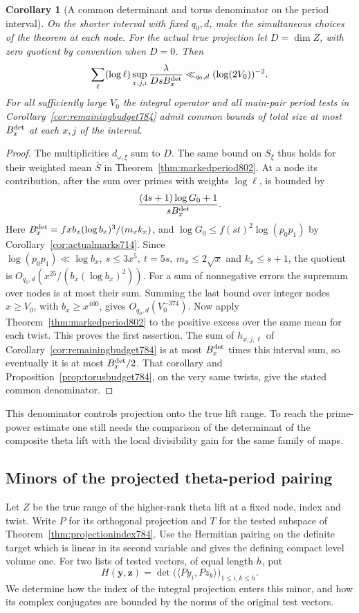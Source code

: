 \documentclass[a4paper,11pt]{article}
\newtheorem{corollary}[proposition]{Corollary}
\theoremstyle{definition}
\theoremstyle{remark}
\numberwithin{equation}{section}
\begin{document}
\begin{corollary}[A common determinant and torus denominator on the period interval]
\leavevmode\label{cor:actualdenom803}
On the shorter interval with fixed \(q_0,d\), make the
simultaneous choices of the theorem at each node. For the
actual true projection let \(D=\dim Z\), with zero quotient
by convention when \(D=0\). Then
\[
    \sum_\ell(\log\ell)
       \sup_{x,j,\iota}
          \frac{\lambda}{Ds B_x^{\rm det}}
           \ll_{q_0,d}(\log(2V_0))^{-2}.
\]
For all sufficiently large \(V_0\) the integral operator and
all main-pair period tests in Corollary~\ref{cor:remainingbudget784}
admit common bounds of total size at most \(B_x^{\rm det}\)
at each \(x,j\) of the interval.
\end{corollary}
\begin{proof}
The multiplicities \(d_{\omega,\xi}\) sum to \(D\).
The same bound on \(S_\xi\) thus holds for their weighted mean
\(\overline S\) in Theorem~\ref{thm:markedperiod802}.
At a node its contribution, after the sum over primes with
weights \(\log\ell\), is bounded by
\[
         \frac{(4s+1)\log G_0+1}{sB_x^{\rm det}} .
\]
Here \(B_x^{\rm det}=fxb_x(\log b_x)^3/(m_x k_x)\), and
\(\log G_0\le f(st)^2\log(p_0p_1)\) by
Corollary~\ref{cor:actualmarks714}. Since \(\log(p_0p_1)
\ll\log b_x,\ s\le3x^5,\ t=5s,\ m_x\le2\sqrt{x}\) and
\(k_x\le s+1\), the quotient is
\(O_{q_0,d}(x^{25}/(b_x(\log b_x)^2))\).
For a sum of nonnegative errors the supremum over nodes is at
most their sum. Summing the last bound over integer nodes
\(x\ge V_0\), with \(b_x\ge x^{400}\), gives
\(O_{q_0,d}(V_0^{-374})\). Now apply
Theorem~\ref{thm:markedperiod802} to the positive excess over
the same mean for each twist. This proves the first assertion.
The sum of \(h_{x,j,\ell}\) of
Corollary~\ref{cor:remainingbudget784} is at most \(B_x^{\rm det}\)
times this interval sum, so eventually it is at most
\(B_x^{\rm det}/2\). That corollary and
Proposition~\ref{prop:torusbudget784}, on the very same twists,
give the stated common denominator.
\end{proof}
This denominator controls projection onto the true lift range.
To reach the prime-power estimate one still needs the comparison
of the determinant of the composite theta lift with the local
divisibility gain for the same family of maps.
\clearpage

\subsection{Minors of the projected theta-period pairing}
\label{sec:testedminors804}
Let \(Z\) be the true range of the higher-rank theta lift at a
fixed node, index and twist. Write \(P\) for its orthogonal
projection and \(T\) for the tested subspace of
Theorem~\ref{thm:projectionindex784}. Use the Hermitian pairing
on the definite target which is linear in its second variable
and gives the defining compact level volume one. For two lists
of tested vectors, of equal length \(h\), put
\[
   H(\mathbf y,\mathbf z)=
       \det\bigl(\langle P y_i,P z_k\rangle\bigr)_{1\le i,k\le h}.
\]
We determine how the index of the integral projection enters
this minor, and how its complex conjugates are bounded by the
norms of the original test vectors.
\end{document}

